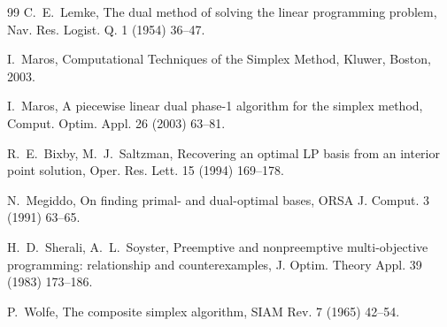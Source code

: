\documentclass[11pt,a4paper]{article}
\theoremstyle{plain}
\theoremstyle{definition}
\theoremstyle{remark}
\begin{document}
\begin{thebibliography}{99}
C.~E.~Lemke,
The dual method of solving the linear programming problem,
Nav. Res. Logist. Q. 1 (1954) 36--47.

I.~Maros,
Computational Techniques of the Simplex Method,
Kluwer, Boston, 2003.

I.~Maros,
A piecewise linear dual phase-1 algorithm for the simplex method,
Comput. Optim. Appl. 26 (2003) 63--81.

R.~E.~Bixby, M.~J.~Saltzman,
Recovering an optimal LP basis from an interior point solution,
Oper. Res. Lett. 15 (1994) 169--178.

N.~Megiddo,
On finding primal- and dual-optimal bases,
ORSA J. Comput. 3 (1991) 63--65.

H.~D.~Sherali, A.~L.~Soyster,
Preemptive and nonpreemptive multi-objective programming: relationship and counterexamples,
J. Optim. Theory Appl. 39 (1983) 173--186.

P.~Wolfe,
The composite simplex algorithm,
SIAM Rev. 7 (1965) 42--54.

\end{thebibliography}
\end{document}
